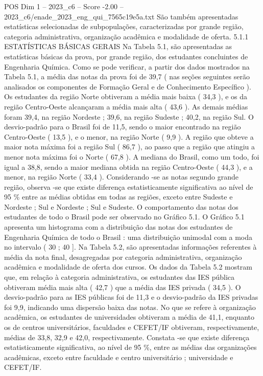 \begin{textsample}{POS Dim 1 – 2023\_c6 – Score -2.00 – 2023\_c6/enade\_2023\_eng\_qui\_7565c19e5a.txt}
São também apresentadas estatísticas selecionadas de subpopulações, caracterizadas por grande região, categoria administrativa, organização acadêmica e modalidade de oferta. 5.1.1 ESTATÍSTICAS BÁSICAS GERAIS Na Tabela 5.1, são apresentadas as estatísticas básicas da prova, por grande região, dos estudantes concluintes de Engenharia Química.
Como se pode verificar, a partir dos dados mostrados na Tabela 5.1, a média das notas da prova foi de 39,7 ( nas seções seguintes serão analisados os componentes de Formação Geral e de Conhecimento Específico ).
Os estudantes da região Norte obtiveram a média mais baixa ( 34,3 ), e os da região Centro-Oeste alcançaram a média mais alta ( 43,6 ).
As demais médias foram 39,4, na região Nordeste ; 39,6, na região Sudeste ; 40,2, na região Sul.
O desvio-padrão para o Brasil foi de 11,5, sendo o maior encontrado na região Centro-Oeste ( 13,5 ), e o menor, na região Norte ( 9,9 ).
A região que obteve a maior nota máxima foi a região Sul ( 86,7 ), ao passo que a região que atingiu a menor nota máxima foi o Norte ( 67,8 ).
A mediana do Brasil, como um todo, foi igual a 38,8, sendo a maior mediana obtida na região Centro-Oeste ( 44,3 ), e a menor, na região Norte ( 33,4 ).
Considerando -se as notas segundo grande região, observa -se que existe diferença estatisticamente significativa ao nível de 95 \% entre as médias obtidas em todas as regiões, exceto entre Sudeste e Nordeste ; Sul e Nordeste ; Sul e Sudeste.
O comportamento das notas dos estudantes de todo o Brasil pode ser observado no Gráfico 5.1.
O Gráfico 5.1 apresenta um histograma com a distribuição das notas dos estudantes de Engenharia Química de todo o Brasil : uma distribuição unimodal com a moda no intervalo ( 30 ; 40 ].
Na Tabela 5.2, são apresentadas informações referentes à média da nota final, desagregadas por categoria administrativa, organização acadêmica e modalidade de oferta dos cursos.
Os dados da Tabela 5.2 mostram que, em relação à categoria administrativa, os estudantes das IES pública obtiveram média mais alta ( 42,7 ) que a média das IES privada ( 34,5 ).
O desvio-padrão para as IES públicas foi de 11,3 e o desvio-padrão da IES privadas foi 9,9, indicando uma dispersão baixa das notas.
No que se refere à organização acadêmica, os estudantes de universidades obtiveram a média de 41,1, enquanto os de centros universitários, faculdades e CEFET/IF obtiveram, respectivamente, médias de 33,8, 32,9 e 42,0, respectivamente.
Constata -se que existe diferença estatisticamente significativa, ao nível de 95 \%, entre as médias das organizações acadêmicas, exceto entre faculdade e centro universitário ; universidade e CEFET/IF.

\end{textsample}
